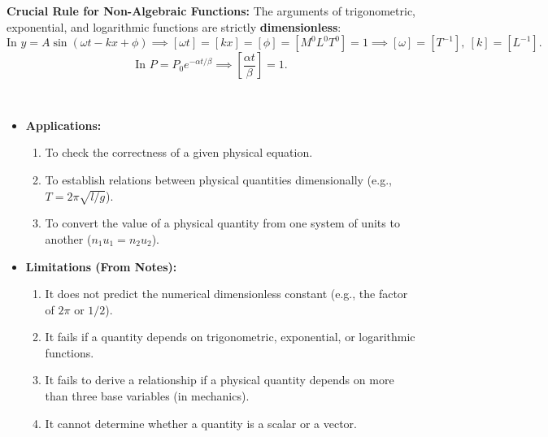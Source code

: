 \documentclass[11pt,a4paper]{article}
\begin{document}
\begin{tcolorbox}[formulacard]
  \textbf{\textcolor{l3Crimson}{Crucial Rule for Non-Algebraic Functions:}}
  The arguments of trigonometric, exponential, and logarithmic functions are strictly \textbf{dimensionless}:
  \[
    \text{In } y = A \sin(\omega t - kx + \phi) \implies [\omega t] = [kx] = [\phi] = [M^0 L^0 T^0] = 1 \implies [\omega] = [T^{-1}], \ [k] = [L^{-1}].
  \]
  \[
    \text{In } P = P_0 e^{-\alpha t / \beta} \implies \left[\frac{\alpha t}{\beta}\right] = 1.
  \]
\end{tcolorbox}

\vspace{4pt}
\noindent{\large\textbf{\textsf{\textcolor{primaryDark}{1.5 Applications \& Limitations of Dimensional Analysis}}}}\\[3pt]
\begin{itemize}[leftmargin=14pt,itemsep=1pt]
  \item \textbf{Applications:}
    \begin{enumerate}[label=(\roman*),itemsep=1pt]
      \item To check the correctness of a given physical equation.
      \item To establish relations between physical quantities dimensionally (e.g., $T = 2\pi\sqrt{l/g}$).
      \item To convert the value of a physical quantity from one system of units to another ($n_1 u_1 = n_2 u_2$).
    \end{enumerate}
  \item \textbf{Limitations (From Notes):}
    \begin{enumerate}[label=(\roman*),itemsep=1pt]
      \item It does not predict the numerical dimensionless constant (e.g., the factor of $2\pi$ or $1/2$).
      \item It fails if a quantity depends on trigonometric, exponential, or logarithmic functions.
      \item It fails to derive a relationship if a physical quantity depends on more than three base variables (in mechanics).
      \item It cannot determine whether a quantity is a scalar or a vector.
    \end{enumerate}
\end{itemize}
\end{document}
